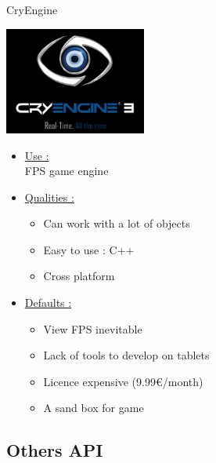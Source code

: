 \documentclass[a4paper,10pt]{beamer}
\begin{document}
			\begin{frame}{CryEngine}
				\begin{multicols}{2}
					\includegraphics[height=100pt]{images/logos/Cry_Engine.png}\\
					
					\columnbreak 
					
					\begin{itemize}
						\item \underline{Use :}\\		
						FPS game engine				
						\item \underline{Qualities :}\\
						\begin{itemize}
							\item Can work with a lot of objects
							\item Easy to use : C++
							\item Cross platform
						\end{itemize}
					\end{itemize}		 
				\end{multicols}
				\begin{itemize}
					\item \underline{Defaults :}\\
					\begin{itemize}
						\item View FPS inevitable
						\item Lack of tools to develop on tablets
						\item Licence expensive (9.99\euro/month)
						\item A sand box for game
					\end{itemize}
				\end{itemize}
			\end{frame}
			
			
		\subsection{Others API}
		
\end{document}
